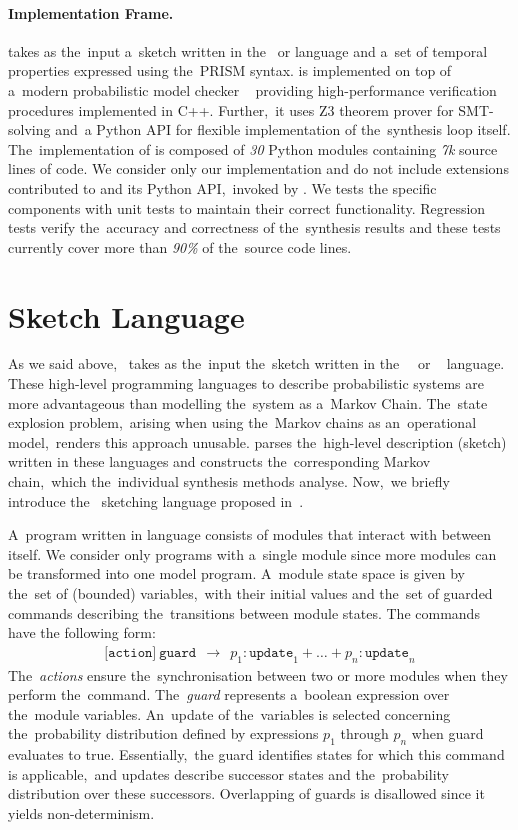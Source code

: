 \paragraph{Implementation Frame.}
\toolname{} takes as the~input a~sketch written in the~\jani{} or \prism{} language and a~set of temporal properties expressed using the~PRISM syntax. 
\toolname{} is implemented on top of a~modern probabilistic model checker \storm{}~\cite{STORM} providing  high-performance verification procedures implemented in C++.
Further,~it uses Z3 theorem prover for SMT-solving and~a Python API for flexible implementation of the~synthesis loop itself.
The~implementation of \toolname{} is composed of \textit{30} Python modules containing \textit{7k} source lines of code.
We consider only our implementation and do not include extensions contributed to \storm{} and its Python API,~invoked by \toolname{}.
We tests the specific components with unit tests to maintain their correct functionality.
Regression tests verify the~accuracy and correctness of the~synthesis results and these tests currently cover more than \textit{90\%} of the~source code lines.

\section{\prism{} Sketch Language}
As we said above,~\toolname{} takes as the~input the~sketch written in the~\prism{}~\cite{KNP11} or \jani{}~\cite{jani} language.
These high-level programming languages to describe probabilistic systems are more advantageous than modelling the~system as a~Markov Chain.
The~state explosion problem,~arising when using the~Markov chains as an~operational model,~renders this approach unusable.
\storm{} parses the~high-level description (sketch) written in these languages and constructs the~corresponding Markov chain,~which the~individual synthesis methods analyse.
Now,~we briefly introduce the~\prism{} sketching language proposed in~\cite{cegis}.

A~program written in \prism{} language consists of modules that interact with between itself.
We consider only programs with a~single module since more modules can be transformed into one model program.
A~module state space is given by the~set of (bounded) variables,~with their initial values and the~set of guarded commands describing the~transitions between module states.
The commands have the following form:
\begin{align*}
\texttt{[action]} \
\texttt{guard}
\ \ \rightarrow \ \
p_1 : \texttt{update}_1 + \dots + p_n : \texttt{update}_n 
\end{align*}
The~\emph{actions} ensure the~synchronisation between two or more modules when they perform the~command.
The~\emph{guard} represents a~boolean expression over the~module variables.
An~update of the~variables is selected concerning the~probability distribution defined by expressions $p_1$ through $p_n$ when guard evaluates to true.
Essentially,~the guard identifies states for which this command is applicable,~and updates describe successor states and the~probability distribution over these successors.
Overlapping of guards is disallowed since it yields non-determinism.

